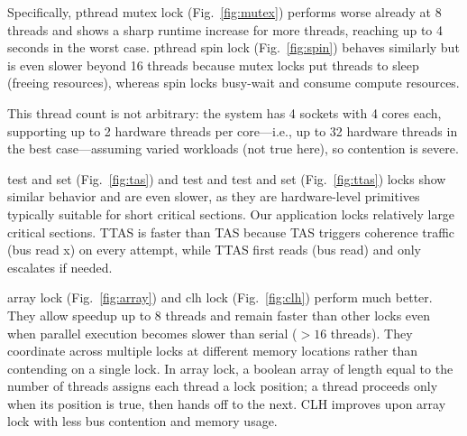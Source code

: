 \documentclass{article}
\newcommand{\eng}[1]{#1}
\begin{document}
Specifically, \eng{pthread mutex lock} (Fig.~\ref{fig:mutex}) performs worse already at 8 threads and shows a sharp runtime increase for more threads, reaching up to 4 seconds in the worst case. \eng{pthread spin lock} (Fig.~\ref{fig:spin}) behaves similarly but is even slower beyond 16 threads because \eng{mutex} locks put threads to sleep (freeing resources), whereas \eng{spin} locks busy-wait and consume compute resources.

This thread count is not arbitrary: the system has 4 sockets with 4 cores each, supporting up to 2 hardware threads per core—i.e., up to 32 hardware threads in the best case—assuming varied workloads (not true here), so contention is severe.

\eng{test and set} (Fig.~\ref{fig:tas}) and \eng{test and test and set} (Fig.~\ref{fig:ttas}) locks show similar behavior and are even slower, as they are hardware-level primitives typically suitable for short critical sections. Our application locks relatively large critical sections. \eng{TTAS} is faster than \eng{TAS} because \eng{TAS} triggers coherence traffic (\eng{bus read x}) on every attempt, while \eng{TTAS} first reads (\eng{bus read}) and only escalates if needed.

\eng{array lock} (Fig.~\ref{fig:array}) and \eng{clh lock} (Fig.~\ref{fig:clh}) perform much better. They allow speedup up to 8 threads and remain faster than other locks even when parallel execution becomes slower than serial ($>16$ threads). They coordinate across multiple locks at different memory locations rather than contending on a single lock. In \eng{array lock}, a boolean array of length equal to the number of threads assigns each thread a lock position; a thread proceeds only when its position is \eng{true}, then hands off to the next. \eng{CLH} improves upon \eng{array lock} with less bus contention and memory usage.
\end{document}
